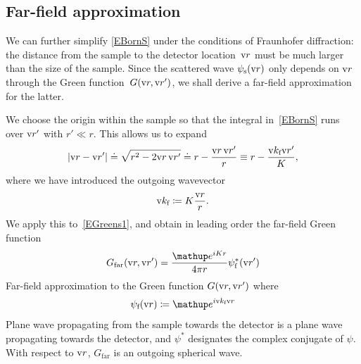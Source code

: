 %

\subsection{Far-field approximation}

%

We can further simplify \cref{EBornS}
under the conditions of Fraunhofer diffraction:
%
the distance from the sample to the detector location~$\text{v}{r}$
must be much larger than the size of the sample.
Since the scattered wave $\psi_\text{s}(\text{v}{r})$
only depends on $\text{v}{r}$ through the Green function~$G(\text{v}{r},\text{v}{r}')$,
we shall derive a far-field approximation for the latter.

We choose the origin within the sample
so that the integral in~\cref{EBornS} runs over $\text{v}{r}'$ with $r'\ll r$.
This allows us to expand
\begin{equation}
  \left|\text{v}{r}-\text{v}{r}'\right|
  \doteq \sqrt{r^2-2\text{v}{r}\,\text{v}{r}'}
  \doteq r - \frac{\text{v}{r}\,\text{v}{r}'}{r}
  \equiv r - \frac{\text{v}{k}_{\text{f}} \text{v}{r}'}{K},
\end{equation}
%
where we have introduced the outgoing wavevector
\begin{equation}
  \text{v}{k}_{\text{f}}\coloneqq K\frac{\text{v}{r}}{r}.
\end{equation}
We apply this to~\cref{EGreens1},
%
and obtain in leading order the far-field Green function
\begin{equation}\label{EGreenFar}
  G_\text{far}(\r,\r')
  = \frac{\e^{iKr}}{4\pi r}\psi^*_\tf(\r')
\end{equation}
  {Far-field approximation to the Green function $G(\text{v}{r},\text{v}{r}')$}
where
\begin{equation}
  \psi_\tf(\r) \coloneqq  \e^{i\k_\tf \r}
\end{equation}
\nomenclature[1ψ034 2f000 2r040]{$\psi_\tf(\r)$}
  {Plane wave propagating from the sample towards the detector}%
is a plane wave propagating towards the detector,
and $\psi^*$ designates the complex conjugate of $\psi$.
With respect to $\text{v}{r}$, $G_\text{far}$ is an outgoing spherical wave.

